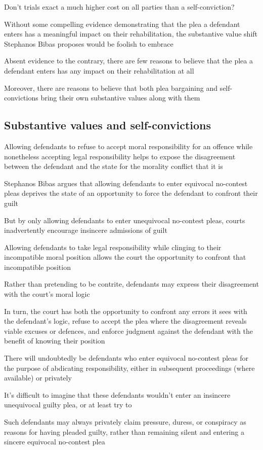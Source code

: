 Don't trials exact a much higher cost on all parties than a self-conviction?

Without some compelling evidence demonstrating that the plea a defendant enters has a meaningful impact on their rehabilitation, the substantive value shift Stephanos Bibas proposes would be foolish to embrace

Absent evidence to the contrary, there are few reasons to believe that the plea a defendant enters has any impact on their rehabilitation at all

Moreover, there are reasons to believe that both plea bargaining and self-convictions bring their own substantive values along with them

\subsection{Substantive values and self-convictions}

Allowing defendants to refuse to accept moral responsibility for an offence while nonetheless accepting legal responsibility helps to expose the disagreement between the defendant and the state for the morality conflict that it is

Stephanos Bibas argues that allowing defendants to enter equivocal no-contest pleas deprives the state of an opportunity to force the defendant to confront their guilt

But by only allowing defendants to enter unequivocal no-contest pleas, courts inadvertently encourage insincere admissions of guilt

Allowing defendants to take legal responsibility while clinging to their incompatible moral position allows the court the opportunity to confront that incompatible position

Rather than pretending to be contrite, defendants may express their disagreement with the court's moral logic

In turn, the court has both the opportunity to confront any errors it sees with the defendant's logic, refuse to accept the plea where the disagreement reveals viable excuses or defences, and enforce judgment against the defendant with the benefit of knowing their position

There will undoubtedly be defendants who enter equivocal no-contest pleas for the purpose of abdicating responsibility, either in subsequent proceedings (where available) or privately

It's difficult to imagine that these defendants wouldn't enter an insincere unequivocal guilty plea, or at least try to

Such defendants may always privately claim pressure, duress, or conspiracy as reasons for having pleaded guilty, rather than remaining silent and entering a sincere equivocal no-contest plea